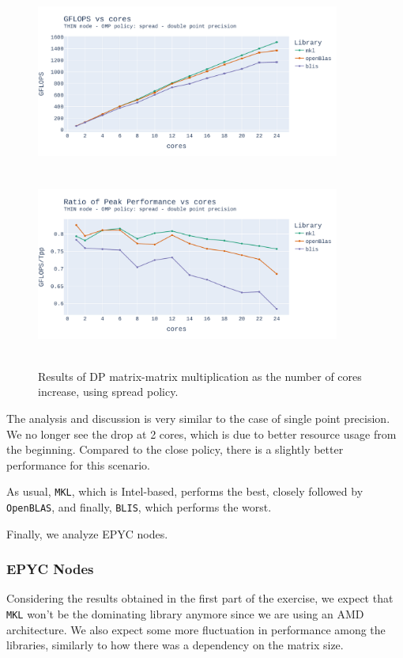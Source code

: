 \documentclass{report}
\begin{document}
\begin{figure}[H]
\hspace*{-2.5cm}
\includegraphics[width=10cm, height=6cm]{./images/fixed_size_thin_double_gflops_spread.pdf}
\includegraphics[width=10cm, height=6cm]{./images/fixed_size_thin_double_gflops_spread_ratio.pdf}
\caption{\label{fig:fixed_size_thin_double_spread} Results of DP matrix-matrix multiplication 
as the number of cores increase, using spread policy.}
\end{figure}

The analysis and discussion is very similar to the case of single point precision. 
We no longer see the drop at 2 cores, which is due to better resource usage from 
the beginning. Compared to the close policy, there is a slightly better performance 
for this scenario.

As usual, \texttt{MKL}, which is Intel-based, performs the best, 
closely followed by \texttt{OpenBLAS}, and finally, \texttt{BLIS}, which performs the worst. 

Finally, we analyze EPYC nodes.

\subsubsection{EPYC Nodes}

Considering the results obtained in the first part of the exercise, we expect 
that \texttt{MKL} won't be the dominating library anymore since we are using 
an AMD architecture. We also expect some more fluctuation in performance among 
the libraries, similarly to how there was a dependency on the matrix size. 
\end{document}
